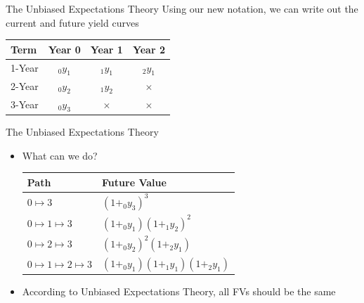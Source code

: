 \documentclass{beamer}
\begin{document}
\begin{frame}{The Unbiased Expectations Theory}
Using our new notation, we can write out the current and future yield curves
\begin{table}[H]
    \begin{center}
        \begin{tabular}{lccc}
            Term & Year 0 & Year 1 & Year 2 \\ \hline
            1-Year & $_{0}y_{1}$ & $_{1}y_{1}$ & $_{2}y_{1}$\\
            2-Year & $_{0}y_{2}$ & $_{1}y_{2}$ & $\times$ \\
            3-Year & $_{0}y_{3}$ & $\times$ & $\times$
        \end{tabular}
    \end{center}
\end{table}
\end{frame}


\begin{frame}{The Unbiased Expectations Theory}
    \begin{itemize}
        \item What can we do?
\begin{table}[H]
\begin{center}
    \begin{tabular}{ll}
        Path & Future Value \\ \hline
        $0\mapsto3$ & $(1+_{0}y_{3})^{3}$\\
        $0\mapsto1\mapsto3$ & $(1+_{0}y_{1})(1+_{1}y_{2})^{2}$\\
        $0\mapsto2\mapsto3$ & $(1+_{0}y_{2})^{2}(1+_{2}y_{1})$\\
        $0\mapsto1\mapsto2\mapsto3$ & $(1+_{0}y_{1})(1+_{1}y_{1})(1+_{2}y_{1})$
\end{tabular}
\end{center}
\end{table}
        \item According to Unbiased Expectations Theory, all FVs should be the same
    \end{itemize}
\end{frame}
\end{document}
